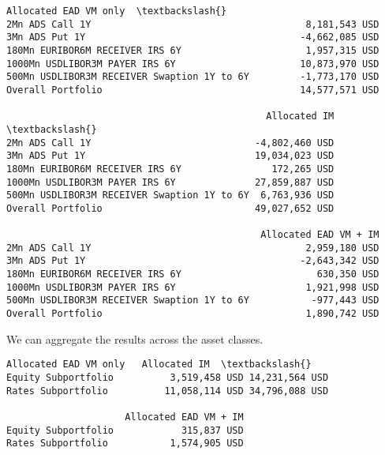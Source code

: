             \begin{tcolorbox}[breakable, size=fbox, boxrule=.5pt, pad at break*=1mm, opacityfill=0]
\begin{Verbatim}[commandchars=\\\{\}]
                                             Allocated EAD VM only  \textbackslash{}
2Mn ADS Call 1Y                                      8,181,543 USD
3Mn ADS Put 1Y                                      -4,662,085 USD
180Mn EURIBOR6M RECEIVER IRS 6Y                      1,957,315 USD
1000Mn USDLIBOR3M PAYER IRS 6Y                      10,873,970 USD
500Mn USDLIBOR3M RECEIVER Swaption 1Y to 6Y         -1,773,170 USD
Overall Portfolio                                   14,577,571 USD

                                              Allocated IM  \textbackslash{}
2Mn ADS Call 1Y                             -4,802,460 USD
3Mn ADS Put 1Y                              19,034,023 USD
180Mn EURIBOR6M RECEIVER IRS 6Y                172,265 USD
1000Mn USDLIBOR3M PAYER IRS 6Y              27,859,887 USD
500Mn USDLIBOR3M RECEIVER Swaption 1Y to 6Y  6,763,936 USD
Overall Portfolio                           49,027,652 USD

                                             Allocated EAD VM + IM
2Mn ADS Call 1Y                                      2,959,180 USD
3Mn ADS Put 1Y                                      -2,643,342 USD
180Mn EURIBOR6M RECEIVER IRS 6Y                        630,350 USD
1000Mn USDLIBOR3M PAYER IRS 6Y                       1,921,998 USD
500Mn USDLIBOR3M RECEIVER Swaption 1Y to 6Y           -977,443 USD
Overall Portfolio                                    1,890,742 USD
\end{Verbatim}
\end{tcolorbox}
        
    We can aggregate the results across the asset classes.

            \begin{tcolorbox}[breakable, size=fbox, boxrule=.5pt, pad at break*=1mm, opacityfill=0]
\begin{Verbatim}[commandchars=\\\{\}]
                     Allocated EAD VM only   Allocated IM  \textbackslash{}
Equity Subportfolio          3,519,458 USD 14,231,564 USD
Rates Subportfolio          11,058,114 USD 34,796,088 USD

                     Allocated EAD VM + IM
Equity Subportfolio            315,837 USD
Rates Subportfolio           1,574,905 USD
\end{Verbatim}
\end{tcolorbox}
        
